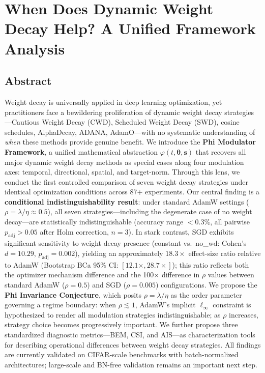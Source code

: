 \documentclass[
]{article}
\author{}
\date{}
\begin{document}
\hypertarget{when-does-dynamic-weight-decay-help-a-unified-framework-analysis}{%
\section{When Does Dynamic Weight Decay Help? A Unified Framework
Analysis}\label{when-does-dynamic-weight-decay-help-a-unified-framework-analysis}}

\hypertarget{abstract}{%
\subsection{Abstract}\label{abstract}}

Weight decay is universally applied in deep learning optimization, yet
practitioners face a bewildering proliferation of dynamic weight decay
strategies---Cautious Weight Decay (CWD), Scheduled Weight Decay (SWD),
cosine schedules, AlphaDecay, ADANA, AdamO---with no systematic
understanding of \emph{when} these methods provide genuine benefit. We
introduce the \textbf{Phi Modulator Framework}, a unified mathematical
abstraction \(\varphi(t, \boldsymbol{\theta}, \mathbf{s})\) that
recovers all major dynamic weight decay methods as special cases along
four modulation axes: temporal, directional, spatial, and target-norm.
Through this lens, we conduct the first controlled comparison of seven
weight decay strategies under identical optimization conditions across
87+ experiments. Our central finding is a \textbf{conditional
indistinguishability result}: under standard AdamW settings
(\(\rho = \lambda/\eta \approx 0.5\)), all seven strategies---including
the degenerate case of no weight decay---are statistically
indistinguishable (accuracy range \(< 0.3\%\), all pairwise
\(p_{\text{adj}} > 0.05\) after Holm correction, \(n = 3\)). In stark
contrast, SGD exhibits significant sensitivity to weight decay presence
(constant vs.~no\_wd: Cohen's \(d = 10.29\),
\(p_{\text{adj}} = 0.002\)), yielding an approximately \(18.3\times\)
effect-size ratio relative to AdamW (Bootstrap BCa 95\% CI:
\([12.1\times, 28.7\times]\)); this ratio reflects both the optimizer
mechanism difference and the 100\(\times\) difference in \(\rho\) values
between standard AdamW (\(\rho = 0.5\)) and SGD (\(\rho = 0.005\))
configurations. We propose the \textbf{Phi Invariance Conjecture}, which
posits \(\rho = \lambda/\eta\) as the order parameter governing a regime
boundary: when \(\rho \lesssim 1\), AdamW's implicit \(\ell_\infty\)
constraint is hypothesized to render all modulation strategies
indistinguishable; as \(\rho\) increases, strategy choice becomes
progressively important. We further propose three standardized
diagnostic metrics---BEM, CSI, and AIS---as characterization tools for
describing operational differences between weight decay strategies. All
findings are currently validated on CIFAR-scale benchmarks with
batch-normalized architectures; large-scale and BN-free validation
remains an important next step.
\end{document}
